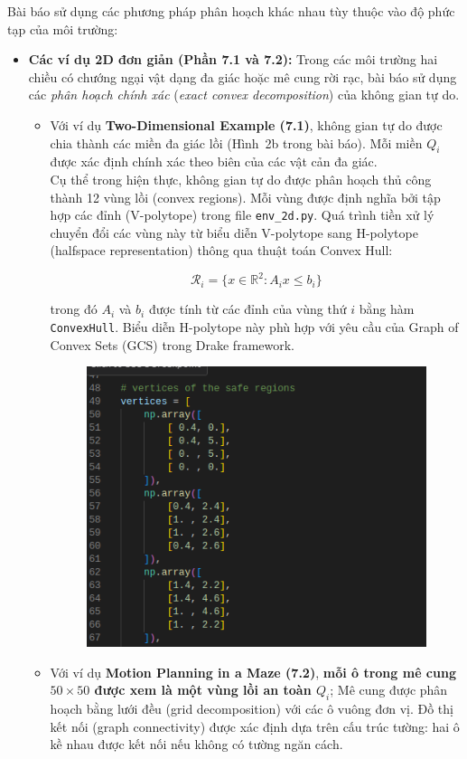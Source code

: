 \documentclass{article}
\begin{document}
Bài báo sử dụng các phương pháp phân hoạch khác nhau tùy thuộc vào độ phức tạp của môi trường:
\begin{itemize}
  \item \textbf{Các ví dụ 2D đơn giản (Phần 7.1 và 7.2):}  
  Trong các môi trường hai chiều có chướng ngại vật dạng đa giác hoặc mê cung rời rạc, bài báo sử dụng các \textit{phân hoạch chính xác} (\textit{exact convex decomposition}) của không gian tự do.  
  \begin{itemize}
    \item Với ví dụ \textbf{Two-Dimensional Example (7.1)}, không gian tự do được chia thành các miền đa giác lồi (Hình~2b trong bài báo). Mỗi miền \( Q_i \) được xác định chính xác theo biên của các vật cản đa giác. \\
    
    Cụ thể trong hiện thực, không gian tự do được phân hoạch thủ công thành 12 vùng lồi (convex regions). Mỗi vùng được định nghĩa bởi tập hợp các đỉnh (V-polytope) trong file \texttt{env\_2d.py}. Quá trình tiền xử lý chuyển đổi các vùng này từ biểu diễn V-polytope sang H-polytope (halfspace representation) thông qua thuật toán Convex Hull:

    \begin{equation}
    \mathcal{R}_i = \{x \in \mathbb{R}^2 : A_i x \leq b_i\}
    \end{equation}

    trong đó $A_i$ và $b_i$ được tính từ các đỉnh của vùng thứ $i$ bằng hàm \texttt{ConvexHull}. Biểu diễn H-polytope này phù hợp với yêu cầu của Graph of Convex Sets (GCS) trong Drake framework.

    \begin{figure}[H]
        \centering
        \includegraphics[width=0.5\linewidth]{imgs/2d-decompose.png}
    \end{figure}
    
    \item Với ví dụ \textbf{Motion Planning in a Maze (7.2)}, \textbf{mỗi ô trong mê cung \( 50 \times 50 \) được xem là một vùng lồi an toàn \( Q_i \)}; Mê cung được phân hoạch bằng lưới đều (grid decomposition) với các ô vuông đơn vị. Đồ thị kết nối (graph connectivity) được xác định dựa trên cấu trúc tường: hai ô kề nhau được kết nối nếu không có tường ngăn cách.


\end{itemize}
\end{itemize}
\end{document}
